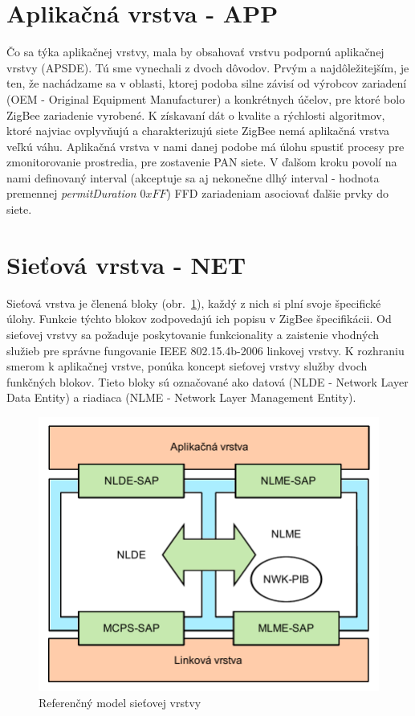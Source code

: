 \section{Aplikačná vrstva - APP}
\indent\indent Čo sa týka aplikačnej vrstvy, mala by obsahovať vrstvu podpornú aplikačnej vrstvy (APSDE). Tú sme vynechali z dvoch dôvodov. Prvým a najdôležitejším, je ten, že nachádzame sa v oblasti, ktorej podoba silne závisí od výrobcov zariadení (OEM - Original Equipment Manufacturer) a konkrétnych účelov, pre ktoré bolo ZigBee zariadenie vyrobené. K získavaní dát o kvalite a rýchlosti algoritmov, ktoré najviac ovplyvňujú a charakterizujú siete ZigBee nemá aplikačná vrstva veľkú váhu. Aplikačná vrstva v nami danej podobe má úlohu spustiť procesy pre zmonitorovanie prostredia, pre zostavenie PAN siete. V ďalšom kroku povolí na nami definovaný interval (akceptuje sa aj nekonečne dlhý interval - hodnota premennej \textit{permitDuration} $0xFF$) FFD zariadeniam asociovať ďalšie prvky do siete.\\

\section{Sieťová vrstva - NET}
\indent\indent Sieťová vrstva je členená bloky (obr.~\ref{fig:topology_net}), každý z nich si plní svoje špecifické úlohy. Funkcie týchto blokov zodpovedajú ich popisu v ZigBee špecifikácii. Od sieťovej vrstvy sa požaduje poskytovanie funkcionality a zaistenie vhodných služieb pre správne fungovanie IEEE 802.15.4b-2006 linkovej vrstvy. K rozhraniu smerom k aplikačnej vrstve, ponúka koncept sieťovej vrstvy služby dvoch funkčných blokov. Tieto bloky sú označované ako datová (NLDE - Network Layer Data Entity) a riadiaca (NLME - Network Layer Management Entity).\\

\begin{figure}[htbp]
\begin{center}
\includegraphics[width=120mm]{figures/topology_net}
\caption{Referenčný model sieťovej vrstvy}
\label{fig:topology_net}
\end{center}
\end{figure}

